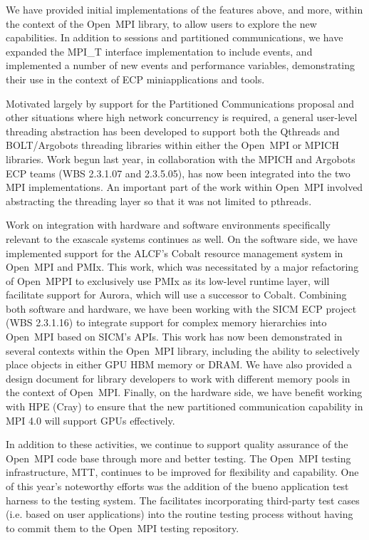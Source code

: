 We have provided initial implementations of the features above, and more, within the context of the Open~MPI library, to allow
users to explore the new capabilities.  In addition to sessions and partitioned communications, we have expanded the
MPI\_T interface implementation to include events, and implemented a number of new events and performance variables,
demonstrating their use in the context of ECP miniapplications and tools.

Motivated largely by support for the Partitioned Communications proposal and other situations where high network 
concurrency is required, a general user-level threading abstraction has been developed to support both the Qthreads 
and BOLT/Argobots threading libraries within either the Open~MPI or MPICH libraries.  Work begun last year, in 
collaboration with the MPICH and Argobots ECP teams (WBS 2.3.1.07 and 2.3.5.05), has now been integrated into the two MPI implementations.
An important part of the work within Open~MPI involved abstracting the threading layer so that it was not limited to pthreads.

Work on integration with hardware and software environments specifically relevant to the exascale systems continues as well.  On the software
side, we have implemented support for the ALCF's Cobalt resource management system in Open~MPI and PMIx.  This work, which was necessitated by
a major refactoring of Open~MPPI to exclusively use PMIx as its low-level runtime layer, will facilitate support for Aurora, 
which will use a successor to Cobalt.  Combining both software and hardware, we have been working with the SICM ECP project
(WBS 2.3.1.16) to integrate support for complex memory hierarchies into Open~MPI based on SICM's APIs.  This work has now
been demonstrated in several contexts within the Open~MPI library, including the ability to selectively place objects in
either GPU HBM memory or DRAM.  We have also provided a design document for library developers
to work with different memory pools in the context of Open~MPI.  Finally, on the hardware side, we have benefit
working with HPE (Cray) to ensure that the new partitioned communication capability in MPI 4.0 will support GPUs effectively.

In addition to these activities, we continue to support quality assurance of the Open~MPI code base through more and better testing.  The Open~MPI testing infrastructure, 
MTT, continues to be improved for flexibility and capability.  One of this year's noteworthy efforts was the addition of the bueno application test harness to the testing 
system.  The facilitates incorporating third-party test cases (i.e. based on user applications) into the routine testing process without having to commit them to the
Open~MPI testing repository.

